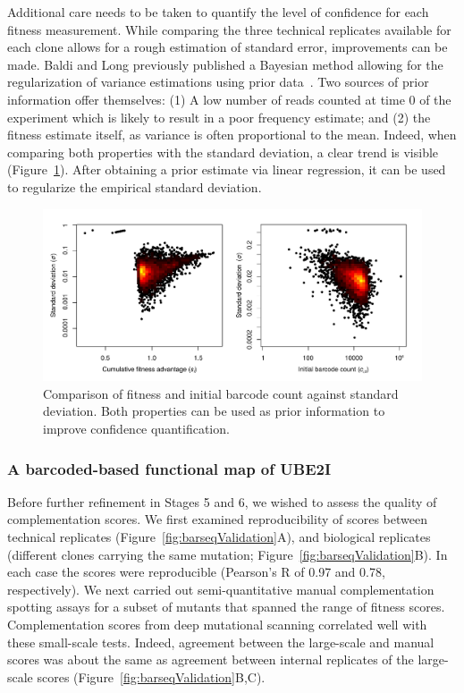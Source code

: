 Additional care needs to be taken to quantify the level of confidence for each fitness measurement. While comparing the three technical replicates available for each clone allows for a rough estimation of standard error, improvements can be made. Baldi and Long previously published a Bayesian method allowing for the regularization of variance estimations using prior data~\cite{baldi_bayesian_2001}. Two sources of prior information offer themselves: (1) A low number of reads counted at time 0 of the experiment which is likely to result in a poor frequency estimate; and (2) the fitness estimate itself, as variance is often proportional to the mean. Indeed, when comparing both properties with the standard deviation, a clear trend is visible (Figure~\ref{fig:baldiLong}). After obtaining a prior estimate via linear regression, it can be used to regularize the empirical standard deviation.

\begin{figure}[h!]
	\centering
	\includegraphics[width=\textwidth]{img/baldi_long.pdf}
	\caption{Comparison of fitness and initial barcode count against standard deviation. Both properties can be used as prior information to improve confidence quantification.}
	\label{fig:baldiLong}
\end{figure}


\subsubsection{A barcoded-based functional map of UBE2I}

Before further refinement in Stages 5 and 6, we wished to assess the quality of complementation scores. We first examined reproducibility of scores between technical replicates (Figure~\ref{fig:barseqValidation}A), and biological replicates (different clones carrying the same mutation; Figure~\ref{fig:barseqValidation}B).  In each case the scores were reproducible (Pearson's R of 0.97 and 0.78, respectively). We next carried out semi-quantitative manual complementation spotting assays for a subset of mutants that spanned the range of fitness scores. Complementation scores from deep mutational scanning correlated well with these small-scale tests. Indeed, agreement between the large-scale and manual scores was about the same as agreement between internal replicates of the large-scale scores (Figure~\ref{fig:barseqValidation}B,C). 

